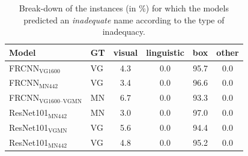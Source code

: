 \begin{table}[t]
	\centering
	\small
	\begin{tabular}{l|l|c@{~}c@{~}c@{~}c}
		\toprule
		{Model} &  GT & visual &  linguistic &  box &  other \\
		\midrule
		FRCNN$_{\text{VG1600}}$ & VG &             4.3 &                 0.0 &                  95.7 &            0.0 \\
		FRCNN$_{\text{MN442}}$ & VG &             3.4 &                 0.0 &                  96.6 &            0.0 \\
		\midrule
		FRCNN$_{\text{VG1600--VGMN}}$ & MN &             6.7 &                 0.0 &                  93.3 &            0.0 \\
		\midrule
		ResNet101$_{\text{MN442}}$ & MN &             3.0 &                 0.0 &                  97.0 &            0.0 \\
		ResNet101$_{\text{VGMN}}$ & VG &             5.6 &                 0.0 &                  94.4 &            0.0 \\
		ResNet101$_{\text{MN442}}$ & VG &             4.8 &                 0.0 &                  95.2 &            0.0 \\
		\bottomrule
	\end{tabular}
	\caption{Break-down of the instances (in \%) for which the models predicted an \textit{inadequate} name according to the type of inadequacy.  \label{tab:exp_inadequacy}}
\end{table}
\iffalse

